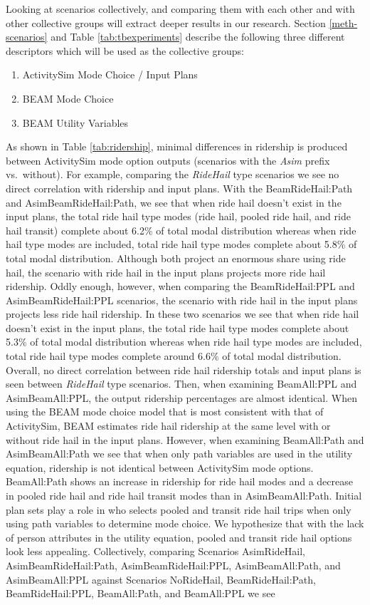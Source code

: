 \documentclass[12pt, oneside, openright]{byuthesis}
\providecommand{\tightlist}{%
  \setlength{\itemsep}{0pt}\setlength{\parskip}{0pt}}
\begin{document}
Looking at scenarios collectively, and comparing them with each other and with other collective groups will extract deeper results in our research. Section \ref{meth-scenarios} and Table \ref{tab:tbexperiments} describe the following three different descriptors which will be used as the collective groups:

\begin{enumerate}
\def\labelenumi{\arabic{enumi}.}
\tightlist
\item
  ActivitySim Mode Choice / Input Plans
\item
  BEAM Mode Choice
\item
  BEAM Utility Variables
\end{enumerate}

As shown in Table \ref{tab:ridership}, minimal differences in ridership is produced between ActivitySim mode option outputs (scenarios with the \emph{Asim} prefix vs.~without). For example, comparing the \emph{RideHail} type scenarios we see no direct correlation with ridership and input plans. With the BeamRideHail:Path and AsimBeamRideHail:Path, we see that when ride hail doesn't exist in the input plans, the total ride hail type modes (ride hail, pooled ride hail, and ride hail transit) complete about 6.2\% of total modal distribution whereas when ride hail type modes are included, total ride hail type modes complete about 5.8\% of total modal distribution. Although both project an enormous share using ride hail, the scenario with ride hail in the input plans projects more ride hail ridership. Oddly enough, however, when comparing the BeamRideHail:PPL and AsimBeamRideHail:PPL scenarios, the scenario with ride hail in the input plans projects less ride hail ridership. In these two scenarios we see that when ride hail doesn't exist in the input plans, the total ride hail type modes complete about 5.3\% of total modal distribution whereas when ride hail type modes are included, total ride hail type modes complete around 6.6\% of total modal distribution. Overall, no direct correlation between ride hail ridership totals and input plans is seen between \emph{RideHail} type scenarios. Then, when examining BeamAll:PPL and AsimBeamAll:PPL, the output ridership percentages are almost identical. When using the BEAM mode choice model that is most consistent with that of ActivitySim, BEAM estimates ride hail ridership at the same level with or without ride hail in the input plans. However, when examining BeamAll:Path and AsimBeamAll:Path we see that when only path variables are used in the utility equation, ridership is not identical between ActivitySim mode options. BeamAll:Path shows an increase in ridership for ride hail modes and a decrease in pooled ride hail and ride hail transit modes than in AsimBeamAll:Path. Initial plan sets play a role in who selects pooled and transit ride hail trips when only using path variables to determine mode choice. We hypothesize that with the lack of person attributes in the utility equation, pooled and transit ride hail options look less appealing. Collectively, comparing Scenarios AsimRideHail, AsimBeamRideHail:Path, AsimBeamRideHail:PPL, AsimBeamAll:Path, and AsimBeamAll:PPL against Scenarios NoRideHail, BeamRideHail:Path, BeamRideHail:PPL, BeamAll:Path, and BeamAll:PPL we see 
\end{document}
